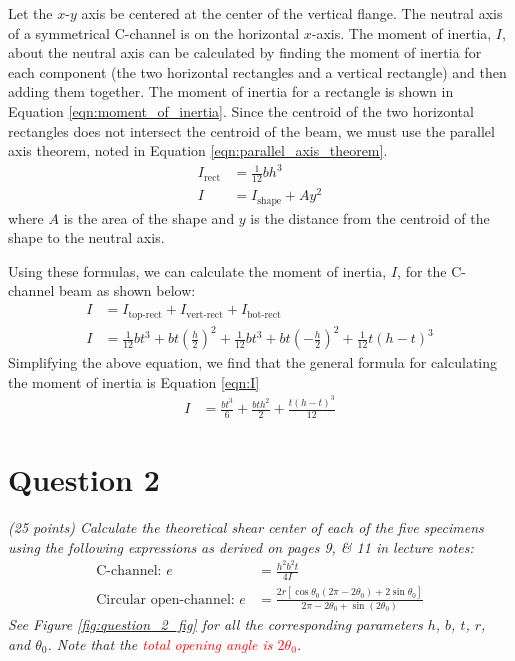 \documentclass[12 pt]{article}
\begin{document}
Let the $x$-$y$ axis be centered at the center of the vertical flange. The neutral axis of a symmetrical C-channel is on the horizontal $x$-axis. The moment of inertia, $I$, about the neutral axis can be calculated by finding the moment of inertia for each component (the two horizontal rectangles and a vertical rectangle) and then adding them together. The moment of inertia for a rectangle is shown in Equation \ref{eqn:moment_of_inertia}. Since the centroid of the two horizontal rectangles does not intersect the centroid of the beam, we must use the parallel axis theorem, noted in Equation \ref{eqn:parallel_axis_theorem}.
\begin{align}
	I_\text{rect}&=\frac{1}{12}bh^3\label{eqn:moment_of_inertia}\\
	I&=I_\text{shape}+Ay^2\label{eqn:parallel_axis_theorem}
\end{align}
where $A$ is the area of the shape and $y$ is the distance from the centroid of the shape to the neutral axis.

Using these formulas, we can calculate the moment of inertia, $I$, for the C-channel beam as shown below:
\begin{align*}
	I&=I_\text{top-rect}+I_\text{vert-rect}+I_\text{bot-rect}\\
	I&=\frac{1}{12}bt^3+bt\left(\frac{h}{2}\right)^2+\frac{1}{12}bt^3+bt\left(-\frac{h}{2}\right)^2+\frac{1}{12}t(h-t)^3
\end{align*}
Simplifying the above equation, we find that the general formula for calculating the moment of inertia is Equation \ref{eqn:I}
\begin{align}\label{eqn:I}
	I&=\frac{bt^3}{6}+\frac{bth^2}{2}+\frac{t(h-t)^3}{12}
\end{align}

\section*{Question 2}
\textit{(\num{25} points) Calculate the theoretical shear center of each of the five specimens using the following expressions as derived on pages \numlist{9;11} in lecture notes:}
\begin{align}
	\text{C-channel: }e&=\frac{h^2b^2t}{4I}\label{eqn:c_channel}\\
	\text{Circular open-channel: }e&=\frac{2r[\cos\theta_0(2\pi-2\theta_0)+2\sin\theta_0]}{2\pi-2\theta_0+\sin(2\theta_0)}
\end{align}
\textit{See Figure \ref{fig:question_2_fig} for all the corresponding parameters $h$, $b$, $t$, $r$, and $\theta_0$. Note that the \textcolor{red}{total opening angle is $2\theta_0$}.}
\end{document}
